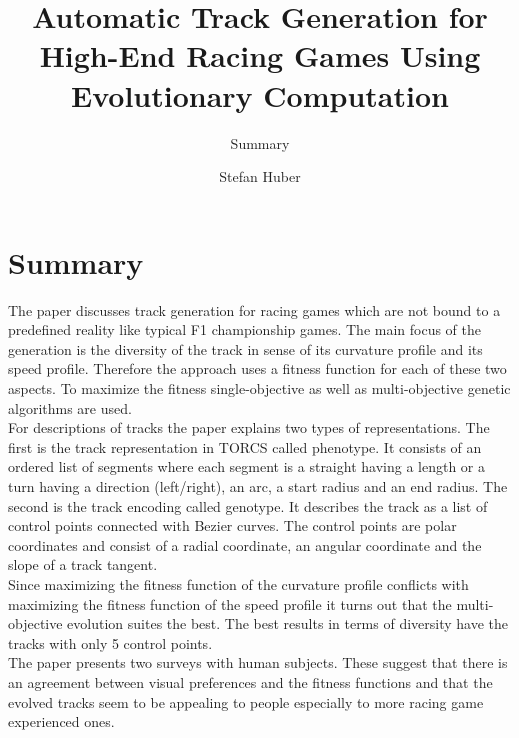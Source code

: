 \documentclass[oneside, notitlepage, twocolumn]{scrartcl}
\title{\LARGE Automatic Track Generation for High-End Racing Games Using Evolutionary Computation}
\subtitle{Summary}
\author{Stefan Huber}
\begin{document}
\maketitle

\section{Summary}
The paper discusses track generation for racing games which are not bound to a predefined reality like typical F1 championship games.
The main focus of the generation is the diversity of the track in sense of its curvature profile and its speed profile.
Therefore the approach uses a fitness function for each of these two aspects.
To maximize the fitness single-objective as well as multi-objective genetic algorithms are used.\\
For descriptions of tracks the paper explains two types of representations.
The first is the track representation in TORCS called phenotype.
It consists of an ordered list of segments where each segment is a straight having a length or a turn having a direction (left/right), an arc, a start radius and an end radius.
The second is the track encoding called genotype.
It describes the track as a list of control points connected with Bezier curves.
The control points are polar coordinates and consist of a radial coordinate, an angular coordinate and the slope of a track tangent.\\
Since maximizing the fitness function of the curvature profile conflicts with maximizing the fitness function of the speed profile it turns out that the multi-objective evolution suites the best.
The best results in terms of diversity have the tracks with only 5 control points.\\
The paper presents two surveys with human subjects.
These suggest that there is an agreement between visual preferences and the fitness functions and that the evolved tracks seem to be appealing to people especially to more racing game experienced ones.
\end{document}
